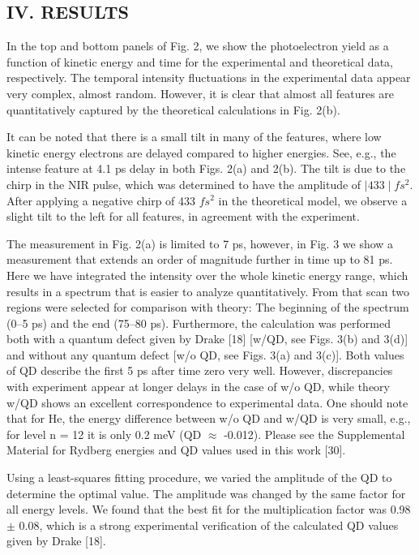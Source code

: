 \documentclass[7pt]{article}
\begin{document}
\begin{multicols}{2}
\small{}
\centering{}
     \section*{\normalsize{IV. RESULTS}}

\justify{}

In the top and bottom panels of Fig. 2, we show the photoelectron yield as a function of kinetic energy and time for the experimental and theoretical data, respectively. The temporal intensity fluctuations in the experimental data appear very complex, almost random. However, it is clear that almost all features are quantitatively captured by the theoretical calculations in Fig. 2(b).

It can be noted that there is a small tilt in many of the features, where low kinetic energy electrons are delayed compared to higher energies. See, e.g., the intense feature at 4.1 ps delay in both Figs. 2(a) and 2(b). The tilt is due to the chirp in the NIR pulse, which was determined to have the amplitude of $\mid 433\mid fs^2$. After applying a negative chirp of 433 $fs^2$ in the theoretical model, we observe a slight tilt to the left for all features, in agreement with the experiment.

The measurement in Fig. 2(a) is limited to 7 ps, however, in Fig. 3 we show a measurement that extends an order of magnitude further in time up to 81 ps. Here we have integrated the intensity over the whole kinetic energy range, which results in a spectrum that is easier to analyze quantitatively. From that scan two regions were selected for comparison with theory: The beginning of the spectrum (0–5 ps) and the end (75–80 ps). Furthermore, the calculation was performed
both with a quantum defect given by Drake [18] [w/QD, see Figs. 3(b) and 3(d)] and without any quantum defect [w/o QD, see Figs. 3(a) and 3(c)]. Both values of QD describe the first 5 ps after time zero very well. However, discrepancies with experiment appear at longer delays in the case of w/o QD, while theory w/QD shows an excellent correspondence to experimental data. One should note that for He, the energy difference between w/o QD and w/QD is very small, e.g., for level n = 12 it is only 0.2 meV (QD $\approx$ -0.012). Please see the Supplemental Material for Rydberg energies and QD values used in this work [30].

Using a least-squares fitting procedure, we varied the amplitude of the QD to determine the optimal value. The amplitude was changed by the same factor for all energy levels. We found that the best fit for the multiplication factor was 0.98 $\pm$ 0.08, which is a strong experimental verification of the calculated QD values given by Drake [18].


\end{multicols}
\end{document}
